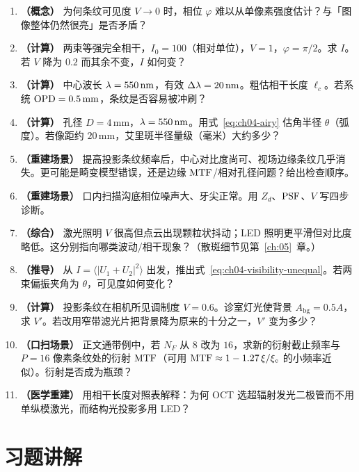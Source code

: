 \begin{enumerate}
  \item \textbf{（概念）} 为何条纹可见度 $V\to0$ 时，相位 $\varphi$ 难以从单像素强度估计？与「图像整体仍然很亮」是否矛盾？
  \item \textbf{（计算）} 两束等强完全相干，$I_0=100$（相对单位），$V=1$，$\varphi=\pi/2$。求 $I$。若 $V$ 降为 $0.2$ 而其余不变，$I$ 如何变？
  \item \textbf{（计算）} 中心波长 $\lambda=550\,\mathrm{nm}$，有效 $\Delta\lambda=20\,\mathrm{nm}$。粗估相干长度 $\ell_c$。若系统 $\mathrm{OPD}=0.5\,\mathrm{mm}$，条纹是否容易被冲刷？
  \item \textbf{（计算）} 孔径 $D=4\,\mathrm{mm}$，$\lambda=550\,\mathrm{nm}$。用式~\eqref{eq:ch04-airy} 估角半径 $\theta$（弧度）。若像距约 $20\,\mathrm{mm}$，艾里斑半径量级（毫米）大约多少？
  \item \textbf{（重建场景）} 提高投影条纹频率后，中心对比度尚可、视场边缘条纹几乎消失。更可能是畸变模型错误，还是边缘 $\mathrm{MTF}$/相对孔径问题？给出检查顺序。
  \item \textbf{（重建场景）} 口内扫描沟底相位噪声大、牙尖正常。用 $Z_d$、$\mathrm{PSF}$、$V$ 写四步诊断。
  \item \textbf{（综合）} 激光照明 $V$ 很高但点云出现颗粒状抖动；LED 照明更平滑但对比度略低。这分别指向哪类波动/相干现象？（散斑细节见第~\ref{ch:05}~章。）
  \item \textbf{（推导）} 从 $I=\langle|U_1+U_2|^2\rangle$ 出发，推出式~\eqref{eq:ch04-visibility-unequal}。若两束偏振夹角为 $\theta$，可见度如何变化？
  \item \textbf{（计算）} 投影条纹在相机所见调制度 $V=0.6$。诊室灯光使背景 $A_{\mathrm{bg}}=0.5A$，求 $V'$。若改用窄带滤光片把背景降为原来的十分之一，$V'$ 变为多少？
  \item \textbf{（口扫场景）} 正文通带例中，若 $N_F$ 从 $8$ 改为 $16$，求新的衍射截止频率与 $P=16$ 像素条纹处的衍射 $\mathrm{MTF}$（可用 $\mathrm{MTF}\approx1-1.27\,\xi/\xi_c$ 的小频率近似）。衍射是否成为瓶颈？
  \item \textbf{（医学重建）} 用相干长度对照表解释：为何 OCT 选超辐射发光二极管而不用单纵模激光，而结构光投影多用 LED？
\end{enumerate}

\section{习题讲解}
\label{sec:ch03-solutions}

